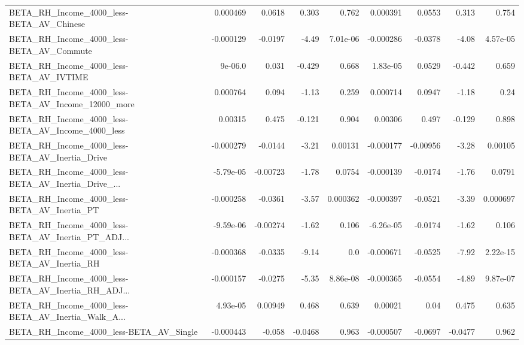 \begin{tabular}{lrrrrrrrr}
BETA\_RH\_Income\_4000\_less-BETA\_AV\_Chinese           &    0.000469 &       0.0618 &    0.303 &    0.762 &   0.000391 &      0.0553 &        0.313 &         0.754 \\
BETA\_RH\_Income\_4000\_less-BETA\_AV\_Commute           &   -0.000129 &      -0.0197 &    -4.49 & 7.01e-06 &  -0.000286 &     -0.0378 &        -4.08 &      4.57e-05 \\
BETA\_RH\_Income\_4000\_less-BETA\_AV\_IVTIME            &     9e-06.0 &        0.031 &   -0.429 &    0.668 &   1.83e-05 &      0.0529 &       -0.442 &         0.659 \\
BETA\_RH\_Income\_4000\_less-BETA\_AV\_Income\_12000\_more &    0.000764 &        0.094 &    -1.13 &    0.259 &   0.000714 &      0.0947 &        -1.18 &          0.24 \\
BETA\_RH\_Income\_4000\_less-BETA\_AV\_Income\_4000\_less  &     0.00315 &        0.475 &   -0.121 &    0.904 &    0.00306 &       0.497 &       -0.129 &         0.898 \\
BETA\_RH\_Income\_4000\_less-BETA\_AV\_Inertia\_Drive     &   -0.000279 &      -0.0144 &    -3.21 &  0.00131 &  -0.000177 &    -0.00956 &        -3.28 &       0.00105 \\
BETA\_RH\_Income\_4000\_less-BETA\_AV\_Inertia\_Drive\_... &   -5.79e-05 &     -0.00723 &    -1.78 &   0.0754 &  -0.000139 &     -0.0174 &        -1.76 &        0.0791 \\
BETA\_RH\_Income\_4000\_less-BETA\_AV\_Inertia\_PT        &   -0.000258 &      -0.0361 &    -3.57 & 0.000362 &  -0.000397 &     -0.0521 &        -3.39 &      0.000697 \\
BETA\_RH\_Income\_4000\_less-BETA\_AV\_Inertia\_PT\_ADJ... &   -9.59e-06 &     -0.00274 &    -1.62 &    0.106 &  -6.26e-05 &     -0.0174 &        -1.62 &         0.106 \\
BETA\_RH\_Income\_4000\_less-BETA\_AV\_Inertia\_RH        &   -0.000368 &      -0.0335 &    -9.14 &      0.0 &  -0.000671 &     -0.0525 &        -7.92 &      2.22e-15 \\
BETA\_RH\_Income\_4000\_less-BETA\_AV\_Inertia\_RH\_ADJ... &   -0.000157 &      -0.0275 &    -5.35 & 8.86e-08 &  -0.000365 &     -0.0554 &        -4.89 &      9.87e-07 \\
BETA\_RH\_Income\_4000\_less-BETA\_AV\_Inertia\_Walk\_A... &    4.93e-05 &      0.00949 &    0.468 &    0.639 &    0.00021 &        0.04 &        0.475 &         0.635 \\
BETA\_RH\_Income\_4000\_less-BETA\_AV\_Single            &   -0.000443 &       -0.058 &  -0.0468 &    0.963 &  -0.000507 &     -0.0697 &      -0.0477 &         0.962 \\

\end{tabular}

